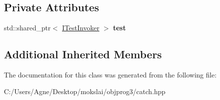 \subsection*{Private Attributes}
\begin{DoxyCompactItemize}
\item 
\mbox{\label{class_catch_1_1_test_case_a7aaa375d6f2bda735095eaa43395b54b}} 
std\+::shared\+\_\+ptr$<$ \mbox{\hyperlink{struct_catch_1_1_i_test_invoker}{I\+Test\+Invoker}} $>$ {\bfseries test}
\end{DoxyCompactItemize}
\subsection*{Additional Inherited Members}


The documentation for this class was generated from the following file\+:\begin{DoxyCompactItemize}
\item 
C\+:/\+Users/\+Agne/\+Desktop/mokslai/objprog3/catch.\+hpp\end{DoxyCompactItemize}
